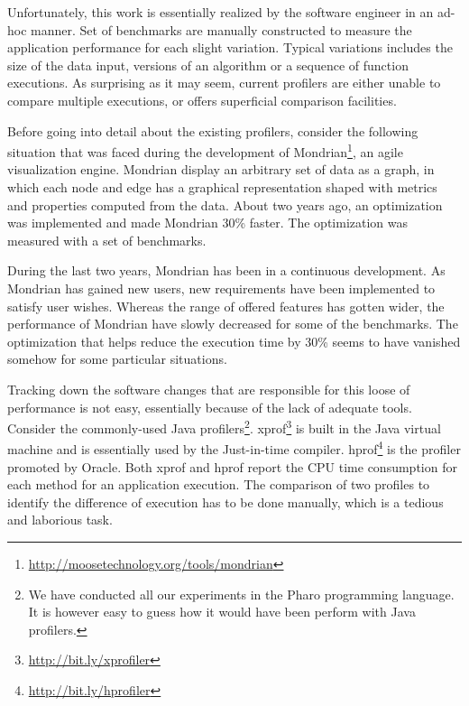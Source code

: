 \documentclass[10pt, conference, compsocconf]{IEEEtran}
\begin{document}
Unfortunately, this work is essentially realized by the software engineer in an ad-hoc manner. Set of benchmarks are manually constructed to measure the application performance for each slight variation. Typical variations includes the size of the data input, versions of an algorithm or a sequence of function executions. As surprising as it may seem, 
current profilers are either unable to compare multiple executions, or offers superficial comparison facilities.

Before going into detail about the existing profilers, consider the following situation that was faced during the development of Mondrian\footnote{\url{http://moosetechnology.org/tools/mondrian}}, an agile visualization engine. Mondrian display an arbitrary set of data as a graph, in which each node and edge has a graphical representation shaped with metrics and properties computed from the data.
About two years ago, an optimization was implemented and made Mondrian 30\% faster. The optimization was measured with a set of benchmarks.

During the last two years, Mondrian has been in a continuous development. As Mondrian has gained new users, new requirements have been implemented to satisfy user wishes. Whereas the range of offered features has gotten wider, the performance of Mondrian have slowly decreased for some of the benchmarks. The optimization that helps reduce the execution time by 30\% seems to have vanished somehow for some particular situations. 

Tracking down the software changes that are responsible for this loose of performance is not easy, essentially because of the lack of adequate tools. Consider the commonly-used Java profilers\footnote{We have conducted all our experiments in the Pharo programming language. It is however easy to guess how it would have been perform with Java profilers.}. xprof\footnote{\url{http://bit.ly/xprofiler}} is built in the Java virtual machine and is essentially used by the Just-in-time compiler. hprof\footnote{\url{http://bit.ly/hprofiler}} is the profiler promoted by Oracle. Both xprof and hprof report the CPU time consumption for each method for an application execution. The comparison of two profiles to identify the difference of execution has to be done manually, which is a tedious and laborious task.
\end{document}
